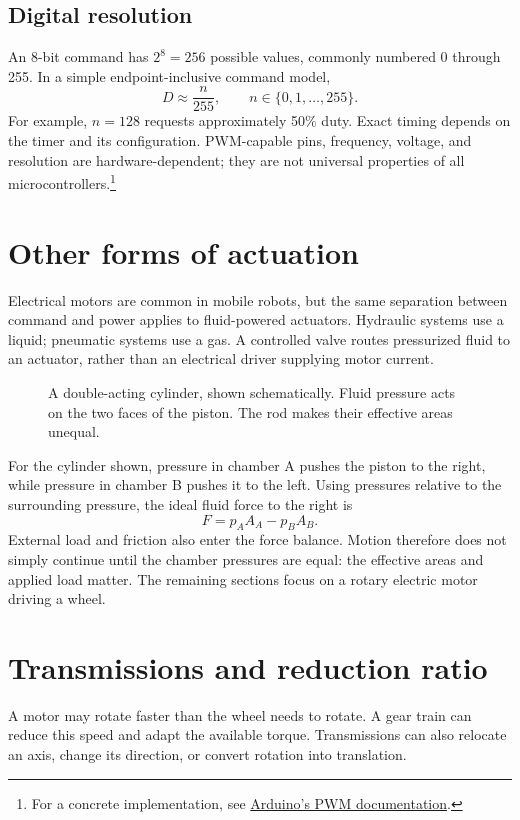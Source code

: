 \subsection{Digital resolution}
An 8-bit command has $2^8=256$ possible values, commonly numbered 0 through
255. In a simple endpoint-inclusive command model,
\[
 D\approx\frac n{255},\qquad n\in\{0,1,\ldots,255\}.
\]
For example, $n=128$ requests approximately 50\% duty. Exact timing depends
on the timer and its configuration. PWM-capable pins, frequency, voltage,
and resolution are hardware-dependent; they are not universal properties of
all microcontrollers.\footnote{For a concrete implementation, see
\href{https://support.arduino.cc/hc/en-us/articles/9350537961500-Use-PWM-output-with-Arduino}{Arduino's PWM documentation}.}

\section{Other forms of actuation}
Electrical motors are common in mobile robots, but the same separation
between command and power applies to fluid-powered actuators. Hydraulic
systems use a liquid; pneumatic systems use a gas. A controlled valve routes
pressurized fluid to an actuator, rather than an electrical driver supplying
motor current.

\begin{figure}[htbp]
\centering
\caption{A double-acting cylinder, shown schematically. Fluid pressure acts
on the two faces of the piston. The rod makes their effective areas unequal.}
\end{figure}

For the cylinder shown, pressure in chamber A pushes the piston to the right,
while pressure in chamber B pushes it to the left. Using pressures relative
to the surrounding pressure, the ideal fluid force to the right is
\[
 F=p_A A_A-p_B A_B.
\]
External load and friction also enter the force balance. Motion therefore
does not simply continue until the chamber pressures are equal: the effective
areas and applied load matter. The remaining sections focus on a rotary
electric motor driving a wheel.

\section{Transmissions and reduction ratio}
A motor may rotate faster than the wheel needs to rotate. A gear train can
reduce this speed and adapt the available torque. Transmissions can also
relocate an axis, change its direction, or convert rotation into translation.

